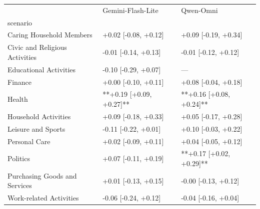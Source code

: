 \begin{tabular}{lll}
\toprule
 & Gemini-Flash-Lite & Qwen-Omni \\
scenario &  &  \\
\midrule
Caring Household Members & +0.02 [-0.08, +0.12] & +0.09 [-0.19, +0.34] \\
Civic and Religious Activities & -0.01 [-0.14, +0.13] & -0.01 [-0.12, +0.12] \\
Educational Activities & -0.10 [-0.29, +0.07] & — \\
Finance & +0.00 [-0.10, +0.11] & +0.08 [-0.04, +0.18] \\
Health & **+0.19 [+0.09, +0.27]** & **+0.16 [+0.08, +0.24]** \\
Household Activities & +0.09 [-0.18, +0.33] & +0.05 [-0.17, +0.28] \\
Leisure and Sports & -0.11 [-0.22, +0.01] & +0.10 [-0.03, +0.22] \\
Personal Care & +0.02 [-0.09, +0.11] & +0.04 [-0.05, +0.12] \\
Politics & +0.07 [-0.11, +0.19] & **+0.17 [+0.02, +0.29]** \\
Purchasing Goods and Services & +0.01 [-0.13, +0.15] & -0.00 [-0.13, +0.12] \\
Work-related Activities & -0.06 [-0.24, +0.12] & -0.04 [-0.16, +0.04] \\
\bottomrule
\end{tabular}
